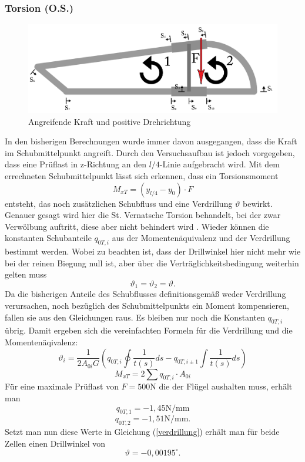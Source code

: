 \subsubsection{Torsion (O.S.)}
\begin{figure}[h]
	\centering
	\includegraphics[width=1\textwidth]{Bilder/Torsion}
	\caption{Angreifende Kraft und positive Drehrichtung}
\end{figure}
In den bisherigen Berechnungen wurde immer davon ausgegangen, dass die Kraft im Schubmittelpunkt angreift. Durch den Versuchsaufbau ist jedoch vorgegeben, dass eine Prüflast in z-Richtung an den $l/4$-Linie aufgebracht wird. Mit dem errechneten Schubmittelpunkt lässt sich erkennen, dass ein Torsionsmoment 
\begin{equation}
	M_{xT}=(y_{l/4}-y_{0})\cdot F
\end{equation}
entsteht, das noch zusätzlichen Schubfluss und eine Verdrillung $\vartheta$ bewirkt. Genauer gesagt wird hier die St. Vernatsche Torsion behandelt, bei der zwar Verwölbung auftritt, diese aber nicht behindert wird \cite{item15}. Wieder können die konstanten Schubanteile $q_{0T,i}$ aus der Momentenäquivalenz und der Verdrillung bestimmt werden. Wobei zu beachten ist, dass der Drillwinkel hier nicht mehr wie bei der reinen Biegung null ist, aber über die Verträglichkeitsbedingung weiterhin gelten muss
\begin{equation}
	\vartheta_{1}=\vartheta_{2}=\vartheta.
\end{equation}
Da die bisherigen Anteile des Schubflusses definitionsgemäß weder Verdrillung verursachen, noch bezüglich des Schubmittelpunkts ein Moment kompensieren, fallen sie aus den Gleichungen raus. Es bleiben nur noch die Konstanten $q_{0T,i}$ übrig. Damit ergeben sich die vereinfachten Formeln für die Verdrillung und die Momentenäqivalenz:
\begin{equation}\label{verdrillung}
	\vartheta_{i} = \frac{1}{2A_{0i}G}(q_{0T,i}\oint\frac{1}{t(s)}ds-q_{0T,i\pm1}\int\frac{1}{t(s)}ds)
\end{equation}
\begin{equation}
		M_{xT}=2\sum q_{0T,i}\cdot A_{0i}
\end{equation}
Für eine maximale Prüflast von $F=500\mathrm{N}$ die der Flügel aushalten muss, erhält man
$$
	q_{0T,1}=-1,45\mathrm{N/mm}
$$
$$
	q_{0T,2}=-1,51\mathrm{N/mm}.
$$
Setzt man nun diese Werte in Gleichung (\ref{verdrillung}) erhält man für beide Zellen einen Drillwinkel von
$$
	\vartheta =-0,00195 ^\circ.
$$

